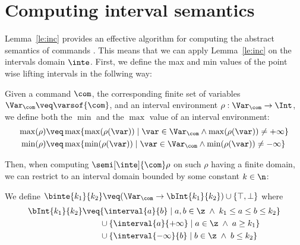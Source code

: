 \section{Computing interval semantics}\label{sec:computingint}

Lemma~\ref{le:inc} provides an effective algorithm for computing the abstract
semantics of commands%
. This means that we can apply Lemma~\ref{le:inc} on the intervals
domain \(\inte\).  First, we define the max and min values of the
point wise lifting intervals in the follwing way:

\begin{definition}\label{def:minmax}
  Given a command \(\com\), the corresponding finite set of variables
  \(\Var_{\com} \veq \varsof{\com}\), and an interval environment
  \(\rho : \Var_{\com} \to \Int\), we define both the \(\min\) and the
  \(\max\) value of an interval environment:
  \begin{align*}
    \max(\rho) & \veq \max \{ \max(\rho(\var)) \mid \var \in \Var_{\com} \land \max(\rho(\var)) \neq + \infty\} \\
    \min(\rho) & \veq \max \{ \min(\rho(\var)) \mid \var \in \Var_{\com} \land \min(\rho(\var)) \neq - \infty\}
  \end{align*}
\end{definition}
% 
Then, when computing \(\semi[\inte]{\com} \rho\) on such \(\rho\)
having a finite domain, we can restrict to an interval domain bounded
by some constant \(k\in\n\):

\begin{definition}\label{def:boundedint}
  We define
  \(\binte{k_1}{k_2} \veq (\Var_{\com} \to \bInt{k_1}{k_2}) \cup
  \{\top, \bot\}\) where
  \begin{align*}
    \bInt{k_1}{k_2} & \veq \{ \interval{a}{b} \mid a, b \in \z \; \land \; k_1 \leq a \leq b \leq k_2\} \\
                    & \phantom{\veq} \cup \{\interval{a}{+\infty} \mid a \in \z \; \land \; a \geq k_1\} \\
                    & \phantom{\veq} \cup \{\interval{-\infty}{b} \mid b \in \z \; \land \; b \leq k_2\}
  \end{align*}
\end{definition}

